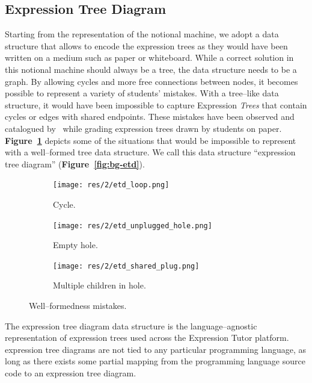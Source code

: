 \begin{chapterBody}
\subsection{Expression Tree Diagram}\label{sec:bg-et-etd}

Starting from the representation of the notional machine, we adopt a data
structure that allows to encode the expression trees as they would have been
written on a medium such as paper or whiteboard.
While a correct solution in this notional machine should always be a tree, the
data structure needs to be a graph. By allowing cycles and
more free connections between nodes, it becomes possible to represent
a variety of students' mistakes. With a tree–like data structure, it would have
been impossible to capture Expression \textit{Trees} that contain cycles or
edges with shared endpoints. These mistakes have been observed and catalogued
by~\citet{chiodiniCuratedInventoryProgramming2021} while grading expression
trees drawn by students on paper.
\textbf{Figure~\ref{fig:bg-et-etd-incorrect}} depicts some of the situations
that would be impossible to represent with a well–formed tree data structure.
We call this data structure ``expression tree diagram''
(\textbf{Figure~\ref{fig:bg-etd}}).

\begin{figure}[ht]
    \centering
    \begin{subfigure}[b]{0.3\textwidth}
        \centering
        \texttt{[image: res/2/etd\_loop.png]}
        \caption{Cycle.}
    \end{subfigure}
    \begin{subfigure}[b]{0.3\textwidth}
        \centering
        \texttt{[image: res/2/etd\_unplugged\_hole.png]}
        \caption{Empty hole.}
    \end{subfigure}
    \begin{subfigure}[b]{0.3\textwidth}
    \centering
        \texttt{[image: res/2/etd\_shared\_plug.png]}
        \caption{Multiple children in hole.}
    \end{subfigure}
    \caption{Well–formedness mistakes.}
    \label{fig:bg-et-etd-incorrect}
\end{figure}

The expression tree diagram data structure is the language–agnostic 
representation of expression trees used across the Expression Tutor platform.
expression tree diagrams are not tied to any particular programming language,
as long as there exists some partial mapping from the programming language 
source code to an expression tree diagram.


\end{chapterBody}
